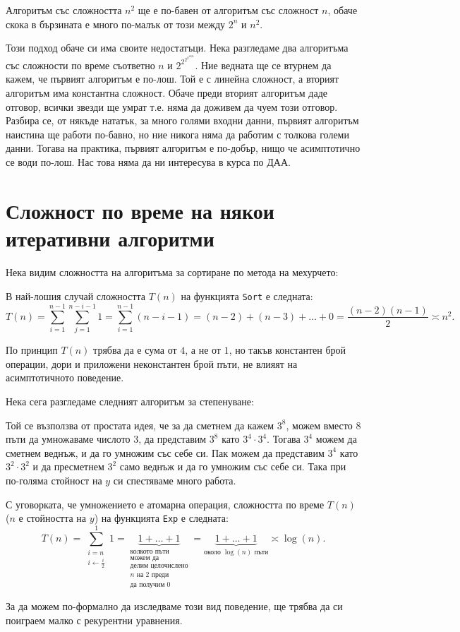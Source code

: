 Алгоритъм със сложността $n^2$ ще е по-бавен от алгоритъм със сложност $n$, обаче скока в бързината е много по-малък от този между $2^n$ и $n^2$.

Този подход обаче си има своите недостатъци.
Нека разгледаме два алгоритъма със сложности по време съответно $n$ и $2^{2^{2^{2^{1024}}}}$.
Ние ведната ще се втурнем да кажем, че първият алгоритъм е по-лош.
Той е с линейна сложност, а вторият алгоритъм има константна сложност.
Обаче преди вторият алгоритъм даде отговор, всички звезди ще умрат т.е. няма да доживем да чуем този отговор.
Разбира се, от някъде нататък, за много голями входни данни, първият алгоритъм наистина ще работи по-бавно, но ние никога няма да работим с толкова големи данни.
Тогава на практика, първият алгоритъм е по-добър, нищо че асимптотично се води по-лош.
Нас това няма да ни интересува в курса по ДАА.

\section{Сложност по време на някои итеративни алгоритми}

Нека видим сложността на алгоритъма за сортиране по метода на мехурчето:


В най-лошия случай сложността $T(n)$ на функцията {\tt Sort} е следната:
\[
  T(n) = \sum\limits_{i = 1}^{n - 1} \sum\limits_{j = 1}^{n - i - 1} 1 = \sum\limits_{i = 1}^{n - 1} (n - i - 1) = (n - 2) + (n - 3) + \dots + 0 = \frac{(n - 2)(n - 1)}{2} \asymp n^2.
\]

По принцип $T(n)$ трябва да е сума от $4$, а не от $1$, но такъв константен брой операции, дори и приложени неконстантен брой пъти, не влияят на асимптотичното поведение.

Нека сега разгледаме следният алгоритъм за степенуване:


Той се възползва от простата идея, че за да сметнем да кажем $3^8$, можем вместо $8$ пъти да умножаваме числото $3$, да представим $3^8$ като $3^4 \cdot 3^4$.
Тогава $3^4$ можем да сметнем веднъж, и да го умножим със себе си.
Пак можем да представим $3^4$ като $3^2 \cdot 3^2$ и да пресметнем $3^2$ само веднъж и да го умножим със себе си.
Така при по-голяма стойност на $y$ си спестяваме много работа.

С уговорката, че умножението е атомарна операция, сложността по време $T(n)$ ($n$ е стойността на $y$) на функцията {\tt Exp} е следната:
\[
  T(n) = \sum\limits_{\substack{i = n \\ i \leftarrow \frac{i}{2}}}^1 1 = \underbrace{1 + \dots + 1}_{\substack{\text{колкото пъти} \\\text{можем да} \\ \text{делим целочислено} \\ n \text{ на } 2 \text{ преди} \\ \text{да получим } 0}} = \underbrace{1 + \dots + 1}_{\text{около } \log(n) \text{ пъти}} \asymp \log(n).
\]

За да можем по-формално да изследваме този вид поведение, ще трябва да си поиграем малко с рекурентни уравнения.

\newpage